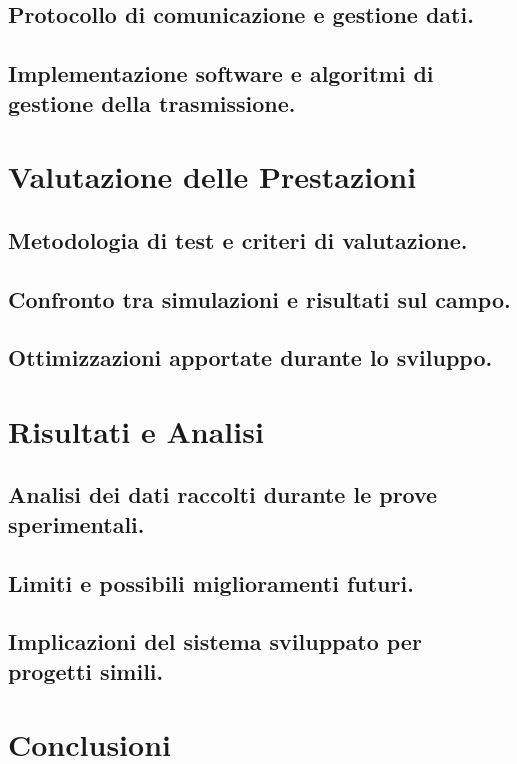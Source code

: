\documentclass[12pt,a4paper,twoside]{book}
\begin{document}
\section{Protocollo di comunicazione e gestione dati.}
\section{Implementazione software e algoritmi di gestione della trasmissione.}

\chapter{Valutazione delle Prestazioni} \label{chap:performance}

\section{Metodologia di test e criteri di valutazione.}
\section{Confronto tra simulazioni e risultati sul campo.}
\section{Ottimizzazioni apportate durante lo sviluppo.}

\chapter{Risultati e Analisi} \label{chap:results}

\section{Analisi dei dati raccolti durante le prove sperimentali.}
\section{Limiti e possibili miglioramenti futuri.}
\section{Implicazioni del sistema sviluppato per progetti simili.}

\chapter{Conclusioni} \label{chap:conclusion}
\end{document}

